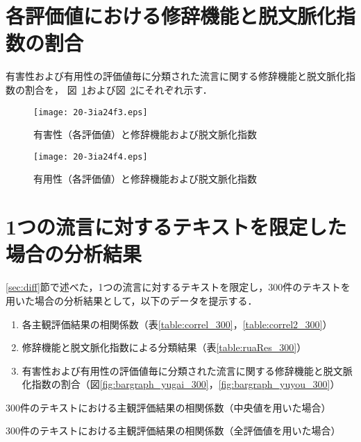 \documentclass[japanese]{jnlp_1.4}
\begin{document}
\appendix
\section{各評価値における修辞機能と脱文脈化指数の割合}
\label{sec:append}

有害性および有用性の評価値毎に分類された流言に関する修辞機能と脱文脈化指数の割合を，
図~\ref{fig:bargraph1}および図~\ref{fig:bargraph2}にそれぞれ示す．

\begin{figure}[h]
\begin{center}
\texttt{[image: 20-3ia24f3.eps]}
\end{center}
\caption{有害性（各評価値）と修辞機能および脱文脈化指数}
\label{fig:bargraph1}
\end{figure}
\clearpage

\begin{figure}[t]
\begin{center}
\texttt{[image: 20-3ia24f4.eps]}
\end{center}
\caption{有用性（各評価値）と修辞機能および脱文脈化指数}
\label{fig:bargraph2}
\end{figure}

\clearpage

\section{1つの流言に対するテキストを限定した場合の分析結果}

\ref{sec:diff}節で述べた，1つの流言に対するテキストを限定し，300件のテキストを用いた場合の分析結果として，以下のデータを提示する．

\begin{enumerate}
\item 各主観評価結果の相関係数（表\ref{table:correl_300}，\ref{table:correl2_300}）
\item 修辞機能と脱文脈化指数による分類結果（表\ref{table:ruaRes_300}）
\item 有害性および有用性の評価値毎に分類された流言に関する修辞機能と脱文脈化指数の割合（図\ref{fig:bargraph_yugai_300}，\ref{fig:bargraph_yuyou_300}）
\end{enumerate}


\begin{table}[h]
\caption{300件のテキストにおける主観評価結果の相関係数（中央値を用いた場合）}
\label{table:correl_300}

\end{table}
\begin{table}[h]
\caption{300件のテキストにおける主観評価結果の相関係数（全評価値を用いた場合）}
\label{table:correl2_300}

\end{table}
\clearpage
\end{document}
